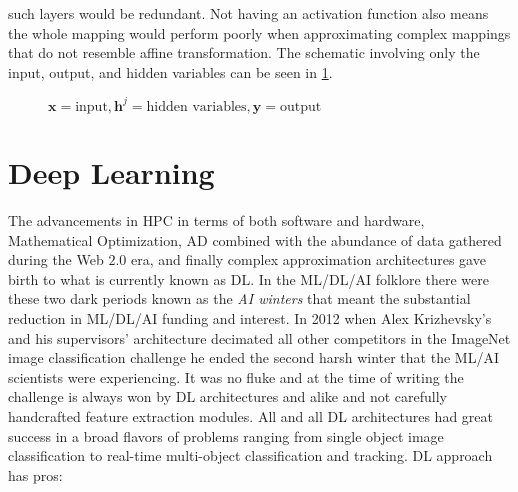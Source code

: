 such layers would be redundant. Not having an activation function also means the whole mapping would perform poorly when approximating 
complex mappings that do not resemble affine transformation. The schematic involving only the input, output, and hidden variables can be seen 
in \cref{fig:multi_layer_perceptron}.
\begin{figure}
  \centering
  \resizebox{0.7\textwidth}{!}{}
  \caption{$\boldsymbol{x} =\text{input},\boldsymbol{h}^j=\text{hidden variables},\boldsymbol{y}=\text{output}$}
  \label{fig:multi_layer_perceptron}
\end{figure}
\section{Deep Learning}
The advancements in \ac{HPC}\cite{Meuer} in terms of both software\cite{OpenMPCommette}\cite{MPICommittee}\cite{Nvidia} and 
hardware\cite{Patterson2014}\cite{Hennessy2019}\cite{Nvidia}, Mathematical Optimization\cite{Boyd2004}\cite{Nocedal2006}\cite{Sun2019}, 
\ac{AD}\cite{Naumann2011}\cite{Griewank2008} combined with the abundance of data gathered during the Web $2.0$ era, 
and finally complex approximation architectures gave birth to what is currently known as 
\ac{DL}\cite{LeCun2015}\cite{Higham2018}\cite{Berner2021}. In the \ac{ML}/\ac{DL}/\ac{AI} folklore there were these two dark 
periods known as the \emph{\ac{AI} winters} that meant the substantial reduction in \ac{ML}/\ac{DL}/\ac{AI} funding and 
interest. In 2012 when Alex Krizhevsky's and his supervisors' \dl architecture \cite{Krizhevsky2017} decimated all other 
competitors in the ImageNet \cite{Vision2021} image classification challenge\cite{Vision} he ended the second harsh winter 
that the \ac{ML}/\ac{AI} scientists were experiencing. It was no fluke and at the time of writing the challenge is 
always won by \ac{DL} architectures \cite{Szegedy2014}\cite{He2015}\cite{Simonyan2014} and alike and not carefully 
handcrafted feature extraction modules. All and all \ac{DL} architectures had great success in a broad flavors of 
problems ranging from single object image classification \cite{Rawat2017} to real-time multi-object classification and 
tracking\cite{Luo2021}. \ac{DL} approach has pros:

